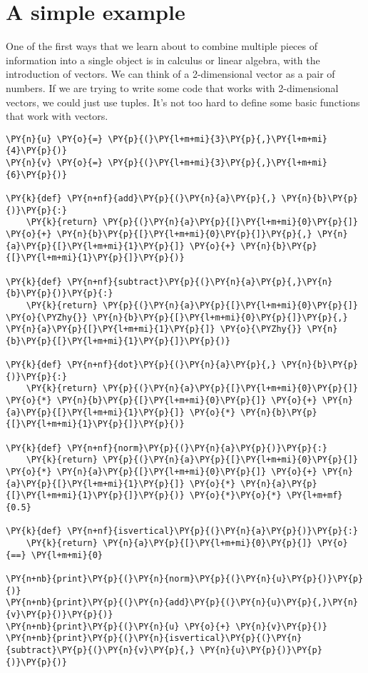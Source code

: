 \section{A simple example}


One of the first ways that we learn about to combine multiple pieces of information into a single object is in calculus or linear algebra, with the introduction of vectors.  We can think of a 2-dimensional vector as a pair of numbers.  If we are trying to write some code that works with 2-dimensional vectors, we could just use tuples.  It's not too hard to define some basic functions that work with vectors.

\begin{Verbatim}[commandchars=\\\{\}]
\PY{n}{u} \PY{o}{=} \PY{p}{(}\PY{l+m+mi}{3}\PY{p}{,}\PY{l+m+mi}{4}\PY{p}{)}
\PY{n}{v} \PY{o}{=} \PY{p}{(}\PY{l+m+mi}{3}\PY{p}{,}\PY{l+m+mi}{6}\PY{p}{)}

\PY{k}{def} \PY{n+nf}{add}\PY{p}{(}\PY{n}{a}\PY{p}{,} \PY{n}{b}\PY{p}{)}\PY{p}{:}
    \PY{k}{return} \PY{p}{(}\PY{n}{a}\PY{p}{[}\PY{l+m+mi}{0}\PY{p}{]} \PY{o}{+} \PY{n}{b}\PY{p}{[}\PY{l+m+mi}{0}\PY{p}{]}\PY{p}{,} \PY{n}{a}\PY{p}{[}\PY{l+m+mi}{1}\PY{p}{]} \PY{o}{+} \PY{n}{b}\PY{p}{[}\PY{l+m+mi}{1}\PY{p}{]}\PY{p}{)}

\PY{k}{def} \PY{n+nf}{subtract}\PY{p}{(}\PY{n}{a}\PY{p}{,}\PY{n}{b}\PY{p}{)}\PY{p}{:}
    \PY{k}{return} \PY{p}{(}\PY{n}{a}\PY{p}{[}\PY{l+m+mi}{0}\PY{p}{]} \PY{o}{\PYZhy{}} \PY{n}{b}\PY{p}{[}\PY{l+m+mi}{0}\PY{p}{]}\PY{p}{,} \PY{n}{a}\PY{p}{[}\PY{l+m+mi}{1}\PY{p}{]} \PY{o}{\PYZhy{}} \PY{n}{b}\PY{p}{[}\PY{l+m+mi}{1}\PY{p}{]}\PY{p}{)}

\PY{k}{def} \PY{n+nf}{dot}\PY{p}{(}\PY{n}{a}\PY{p}{,} \PY{n}{b}\PY{p}{)}\PY{p}{:}
    \PY{k}{return} \PY{p}{(}\PY{n}{a}\PY{p}{[}\PY{l+m+mi}{0}\PY{p}{]} \PY{o}{*} \PY{n}{b}\PY{p}{[}\PY{l+m+mi}{0}\PY{p}{]} \PY{o}{+} \PY{n}{a}\PY{p}{[}\PY{l+m+mi}{1}\PY{p}{]} \PY{o}{*} \PY{n}{b}\PY{p}{[}\PY{l+m+mi}{1}\PY{p}{]}\PY{p}{)}

\PY{k}{def} \PY{n+nf}{norm}\PY{p}{(}\PY{n}{a}\PY{p}{)}\PY{p}{:}
    \PY{k}{return} \PY{p}{(}\PY{n}{a}\PY{p}{[}\PY{l+m+mi}{0}\PY{p}{]} \PY{o}{*} \PY{n}{a}\PY{p}{[}\PY{l+m+mi}{0}\PY{p}{]} \PY{o}{+} \PY{n}{a}\PY{p}{[}\PY{l+m+mi}{1}\PY{p}{]} \PY{o}{*} \PY{n}{a}\PY{p}{[}\PY{l+m+mi}{1}\PY{p}{]}\PY{p}{)} \PY{o}{*}\PY{o}{*} \PY{l+m+mf}{0.5}

\PY{k}{def} \PY{n+nf}{isvertical}\PY{p}{(}\PY{n}{a}\PY{p}{)}\PY{p}{:}
    \PY{k}{return} \PY{n}{a}\PY{p}{[}\PY{l+m+mi}{0}\PY{p}{]} \PY{o}{==} \PY{l+m+mi}{0}

\PY{n+nb}{print}\PY{p}{(}\PY{n}{norm}\PY{p}{(}\PY{n}{u}\PY{p}{)}\PY{p}{)}
\PY{n+nb}{print}\PY{p}{(}\PY{n}{add}\PY{p}{(}\PY{n}{u}\PY{p}{,}\PY{n}{v}\PY{p}{)}\PY{p}{)}
\PY{n+nb}{print}\PY{p}{(}\PY{n}{u} \PY{o}{+} \PY{n}{v}\PY{p}{)}
\PY{n+nb}{print}\PY{p}{(}\PY{n}{isvertical}\PY{p}{(}\PY{n}{subtract}\PY{p}{(}\PY{n}{v}\PY{p}{,} \PY{n}{u}\PY{p}{)}\PY{p}{)}\PY{p}{)}
\end{Verbatim}



